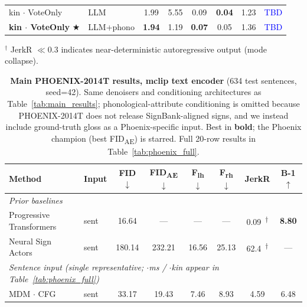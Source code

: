 \documentclass{article}
\newcommand{\placeholder}[1]{\textcolor{blue}{#1}}
\begin{document}
\begin{table}[t]
\begin{tabular}{llcccccc}
    \quad kin $\cdot$ VoteOnly                                     & LLM            & 1.99          & 5.55          & 0.09          & \textbf{0.04} & 1.23          & \placeholder{TBD} \\
    \quad \textbf{kin $\cdot$ VoteOnly} $\bigstar$                 & LLM+phono      & \textbf{1.94} & 1.19          & \textbf{0.07} & 0.05          & 1.36          & \placeholder{TBD} \\
    \bottomrule
  \end{tabular}
  \par\smallskip
  \footnotesize $^\dagger$ JerkR $\ll 0.3$ indicates near-deterministic autoregressive output (mode collapse).
\end{table}

\begin{table}[t]
  \caption{\textbf{Main PHOENIX-2014T results, mclip text encoder} (634 test sentences, seed=42). Same denoisers and conditioning architectures as Table~\ref{tab:main_results}; phonological-attribute conditioning is omitted because PHOENIX-2014T does not release SignBank-aligned signs, and we instead include ground-truth gloss as a Phoenix-specific input. Best in \textbf{bold}; the Phoenix champion (best FID\textsubscript{AE}) is starred. Full 20-row results in Table~\ref{tab:phoenix_full}.}
  \label{tab:phoenix_main}
  \centering
  \small
  \begin{tabular}{llcccccc}
    \toprule
    \textbf{Method} & \textbf{Input} & \textbf{FID}$\downarrow$ & \textbf{FID\textsubscript{AE}}$\downarrow$ & \textbf{F\textsubscript{lh}}$\downarrow$ & \textbf{F\textsubscript{rh}}$\downarrow$ & \textbf{JerkR} & \textbf{B-1}$\uparrow$ \\
    \midrule
    \multicolumn{8}{l}{\textit{Prior baselines}} \\
    \quad Progressive Transformers & sent & 16.64           & ---           & ---           & ---           & 0.09 $\,$\textsuperscript{$\dagger$} & \textbf{8.80} \\
    \quad Neural Sign Actors       & sent & 180.14          & 232.21        & 16.56         & 25.13         & 62.4 $\,$\textsuperscript{$\dagger$} & --- \\
    \midrule
    \multicolumn{8}{l}{\textit{Sentence input (single representative; $\cdot$ms / $\cdot$kin appear in Table~\ref{tab:phoenix_full})}} \\
    \quad MDM $\cdot$ CFG                                          & sent           & 33.17          & 19.43         & 7.46          & 8.93          & 4.59          & 6.48 \\

\end{tabular}
\end{table}
\end{document}
